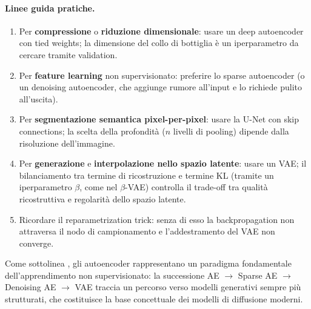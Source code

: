 \paragraph{Linee guida pratiche.}
\begin{enumerate}
  \item Per \textbf{compressione} o \textbf{riduzione dimensionale}:
        usare un deep autoencoder con tied weights; la dimensione del
        collo di bottiglia è un iperparametro da cercare tramite
        validation.
  \item Per \textbf{feature learning} non supervisionato: preferire lo
        sparse autoencoder (o un denoising autoencoder, che aggiunge
        rumore all'input e lo richiede pulito all'uscita).
  \item Per \textbf{segmentazione semantica pixel-per-pixel}: usare la
        U-Net con skip connections; la scelta della profondità ($n$ livelli
        di pooling) dipende dalla risoluzione dell'immagine.
  \item Per \textbf{generazione} e \textbf{interpolazione nello spazio
        latente}: usare un VAE; il bilanciamento tra termine di
        ricostruzione e termine KL (tramite un iperparametro $\beta$,
        come nel $\beta$-VAE) controlla il trade-off tra qualità
        ricostruttiva e regolarità dello spazio latente.
  \item Ricordare il reparametrization trick: senza di esso la
        backpropagation non attraversa il nodo di campionamento e
        l'addestramento del VAE non converge.
\end{enumerate}

Come sottolinea \citet{bishop2024}, gli autoencoder rappresentano un
paradigma fondamentale dell'apprendimento non supervisionato: la
successione AE $\to$ Sparse AE $\to$ Denoising AE $\to$ VAE traccia
un percorso verso modelli generativi sempre più strutturati, che
costituisce la base concettuale dei modelli di diffusione moderni.